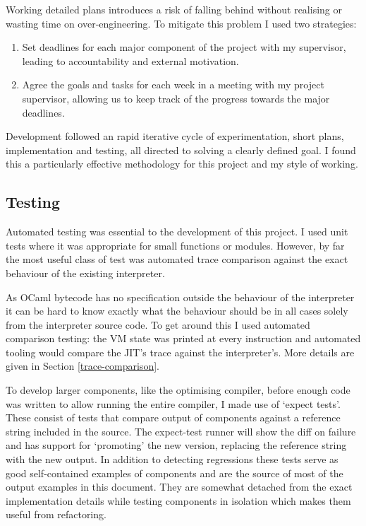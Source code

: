 Working detailed plans introduces a risk of falling behind without realising or wasting
time on over-engineering. To mitigate this problem I used two strategies:

\begin{enumerate}
    \item Set deadlines for each major component of the project with my supervisor, leading to
          accountability and external motivation.
    \item Agree the goals and tasks for each week in a meeting with my project supervisor,
          allowing us to keep track of the progress towards the major deadlines.
\end{enumerate}

Development followed an rapid iterative cycle of experimentation, short plans, implementation and
testing, all directed to solving a clearly defined goal. I found this a particularly effective
methodology for this project and my style of working.

\subsection{Testing}

Automated testing was essential to the development of this project. I used unit tests where it was
appropriate for small functions or modules. However, by far the most useful class of test was
automated trace comparison against the exact behaviour of the existing interpreter.

As OCaml bytecode has no specification outside the behaviour of the interpreter it can be hard
to know exactly what the behaviour should be in all cases solely from the interpreter source code.
To get around this I used automated comparison testing: the VM state was printed at every
instruction and automated
tooling would compare the JIT's trace against the interpreter's. More details are given in
Section \ref{trace-comparison}.

To develop larger components, like the optimising compiler, before enough code was written to allow
running the entire compiler, I made use of `expect tests'. These consist of tests that compare
output of components against a reference string included in the source. The expect-test runner will
show the diff on failure and has support for `promoting' the new version, replacing the reference
string with the new output. In addition to detecting regressions these tests serve as good
self-contained examples of components and are the source of most of the output examples in this
document. They are somewhat detached from the exact implementation details while testing components
in isolation which makes them useful from refactoring.

